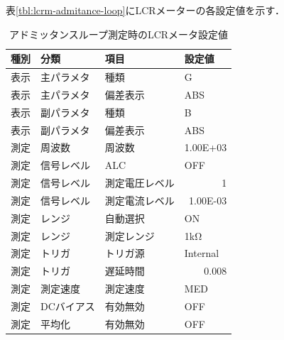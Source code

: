 \documentclass[dvipdfmx,titlepage,a4j]{jsarticle}  %
\numberwithin{equation}{section}
\begin{document}
表\ref{tbl:lcrm-admitance-loop}にLCRメーターの各設定値を示す．
\begin{table}[H]
  \caption{アドミッタンスループ測定時のLCRメータ設定値}
  \begin{center}
    \begin{tabular}{l|l|l|l}
      \hline
      種別           & 分類                          & 項目           & 設定値                       \\ \hline\hline
      表示           & 主パラメタ                    & 種類           & G                            \\ \hline
      表示           & 主パラメタ                    & 偏差表示       & ABS                          \\ \hline
      表示           & 副パラメタ                    & 種類           & B                            \\ \hline
      表示           & 副パラメタ                    & 偏差表示       & ABS                          \\ \hline
      測定           & 周波数                        & 周波数         & \multicolumn{1}{r}{1.00E+03} \\ \hline
      測定           & 信号レベル                    & ALC            & OFF                          \\ \hline
      測定           & 信号レベル                    & 測定電圧レベル & \multicolumn{1}{r}{1}        \\ \hline
      測定           & 信号レベル                    & 測定電流レベル & \multicolumn{1}{r}{1.00E-03} \\ \hline
      測定           & レンジ                        & 自動選択       & ON                           \\ \hline
      測定           & レンジ                        & 測定レンジ     & 1kΩ                          \\ \hline
      測定           & トリガ                        & トリガ源       & Internal                     \\ \hline
      測定           & トリガ                        & 遅延時間       & \multicolumn{1}{r}{0.008}    \\ \hline
      測定           & 測定速度                      & 測定速度       & MED                          \\ \hline
      測定           & DCバイアス                    & 有効無効       & OFF                          \\ \hline
      測定           & 平均化                        & 有効無効       & OFF                          \\ \hline

\end{tabular}
\end{center}
\end{table}
\end{document}
